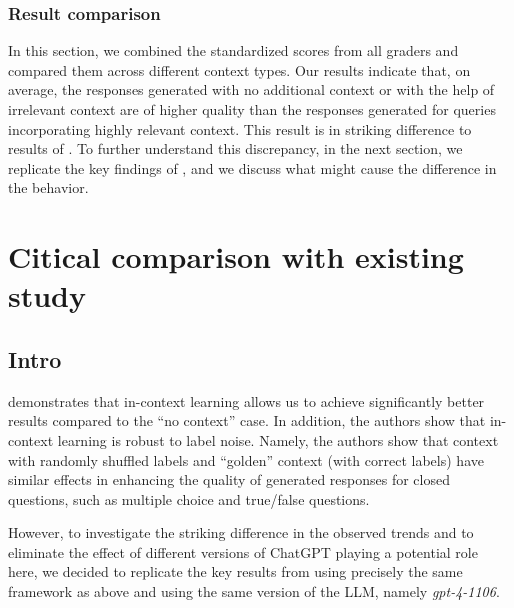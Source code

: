 \documentclass{article}
\begin{document}
\subsubsection{Result comparison}
    
    In this section, we combined the standardized scores from all graders and compared them across different context types. Our results indicate that, on average, the responses generated with no additional context or with the help of irrelevant context are of higher quality than the responses generated for queries incorporating highly relevant context.
    This result is in striking difference to results of \citet{min2022rethinking}. To further understand this discrepancy, in the next section, we replicate the key findings of \citet{min2022rethinking}, and we discuss what might cause the difference in the behavior.


    
\section{Citical comparison with existing study}

\subsection{Intro}

    \citet{min2022rethinking} demonstrates that in-context learning allows us to achieve significantly better results compared to the ``no context'' case. In addition, the authors show that in-context learning is robust to label noise. Namely, the authors show that context with randomly shuffled labels and ``golden'' context (with correct labels) have similar effects in enhancing the quality of generated responses for closed questions, such as multiple choice and true/false questions.

    However, to investigate the striking difference in the observed trends and to eliminate the effect of different versions of ChatGPT playing a potential role here, we decided to replicate the key results from \citet{min2022rethinking} using precisely the same framework as above and using the same version of the LLM, namely \emph{gpt-4-1106}.
\end{document}
